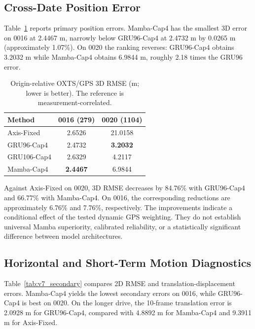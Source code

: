 \subsection{Cross-Date Position Error}
Table~\ref{tab:v7_main} reports primary position errors.
Mamba-Cap4 has the smallest 3D error on 0016 at
2.4467 m, narrowly below GRU96-Cap4 at 2.4732 m
by 0.0265 m (approximately 1.07\%). On 0020
the ranking reverses: GRU96-Cap4 obtains 3.2032 m
while Mamba-Cap4 obtains 6.9844 m, roughly 2.18
times the GRU96 error.

\begin{table}[!t]
\centering
\caption{Origin-relative OXTS/GPS 3D RMSE (m; lower is better).
The reference is measurement-correlated.}
\label{tab:v7_main}
\begin{tabular}{lcc}
\hline
Method & 0016 (279) & 0020 (1104)\\
\hline
Axis-Fixed & 2.6526 & 21.0158\\
GRU96-Cap4 & 2.4732 & \textbf{3.2032}\\
GRU106-Cap4 & 2.6329 & 4.2117\\
Mamba-Cap4 & \textbf{2.4467} & 6.9844\\
\hline
\end{tabular}
\end{table}

Against Axis-Fixed on 0020, 3D RMSE decreases
by 84.76\% with GRU96-Cap4 and 66.77\% with
Mamba-Cap4. On 0016, the corresponding reductions
are approximately 6.76\% and 7.76\%, respectively.
The improvements indicate a conditional effect
of the tested dynamic GPS weighting. They do not
establish universal Mamba superiority, calibrated
reliability, or a statistically significant difference
between model architectures.

\subsection{Horizontal and Short-Term Motion Diagnostics}
Table~\ref{tab:v7_secondary} compares 2D RMSE and
translation-displacement errors. Mamba-Cap4 yields
the lowest secondary errors on 0016, while
GRU96-Cap4 is best on 0020. On the longer drive,
the 10-frame translation error is 2.0928 m for
GRU96-Cap4, compared with 4.8892 m for Mamba-Cap4
and 9.3911 m for Axis-Fixed.

